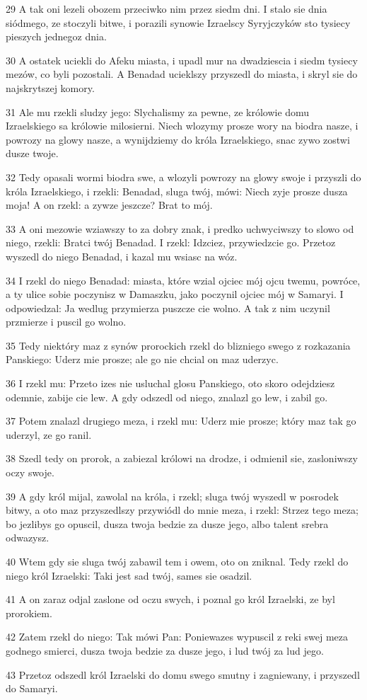 \par 29 A tak oni lezeli obozem przeciwko nim przez siedm dni. I stalo sie dnia siódmego, ze stoczyli bitwe, i porazili synowie Izraelscy Syryjczyków sto tysiecy pieszych jednegoz dnia.
\par 30 A ostatek uciekli do Afeku miasta, i upadl mur na dwadziescia i siedm tysiecy mezów, co byli pozostali. A Benadad ucieklszy przyszedl do miasta, i skryl sie do najskrytszej komory.
\par 31 Ale mu rzekli sludzy jego: Slychalismy za pewne, ze królowie domu Izraelskiego sa królowie milosierni. Niech wlozymy prosze wory na biodra nasze, i powrozy na glowy nasze, a wynijdziemy do króla Izraelskiego, snac zywo zostwi dusze twoje.
\par 32 Tedy opasali wormi biodra swe, a wlozyli powrozy na glowy swoje i przyszli do króla Izraelskiego, i rzekli: Benadad, sluga twój, mówi: Niech zyje prosze dusza moja! A on rzekl: a zywze jeszcze? Brat to mój.
\par 33 A oni mezowie wziawszy to za dobry znak, i predko uchwyciwszy to slowo od niego, rzekli: Bratci twój Benadad. I rzekl: Idzciez, przywiedzcie go. Przetoz wyszedl do niego Benadad, i kazal mu wsiasc na wóz.
\par 34 I rzekl do niego Benadad: miasta, które wzial ojciec mój ojcu twemu, powróce, a ty ulice sobie poczynisz w Damaszku, jako poczynil ojciec mój w Samaryi. I odpowiedzal: Ja wedlug przymierza puszcze cie wolno. A tak z nim uczynil przmierze i puscil go wolno.
\par 35 Tedy niektóry maz z synów prorockich rzekl do blizniego swego z rozkazania Panskiego: Uderz mie prosze; ale go nie chcial on maz uderzyc.
\par 36 I rzekl mu: Przeto izes nie usluchal glosu Panskiego, oto skoro odejdziesz odemnie, zabije cie lew. A gdy odszedl od niego, znalazl go lew, i zabil go.
\par 37 Potem znalazl drugiego meza, i rzekl mu: Uderz mie prosze; który maz tak go uderzyl, ze go ranil.
\par 38 Szedl tedy on prorok, a zabiezal królowi na drodze, i odmienil sie, zasloniwszy oczy swoje.
\par 39 A gdy król mijal, zawolal na króla, i rzekl; sluga twój wyszedl w posrodek bitwy, a oto maz przyszedlszy przywiódl do mnie meza, i rzekl: Strzez tego meza; bo jezlibys go opuscil, dusza twoja bedzie za dusze jego, albo talent srebra odwazysz.
\par 40 Wtem gdy sie sluga twój zabawil tem i owem, oto on zniknal. Tedy rzekl do niego król Izraelski: Taki jest sad twój, sames sie osadzil.
\par 41 A on zaraz odjal zaslone od oczu swych, i poznal go król Izraelski, ze byl prorokiem.
\par 42 Zatem rzekl do niego: Tak mówi Pan: Poniewazes wypuscil z reki swej meza godnego smierci, dusza twoja bedzie za dusze jego, i lud twój za lud jego.
\par 43 Przetoz odszedl król Izraelski do domu swego smutny i zagniewany, i przyszedl do Samaryi.

